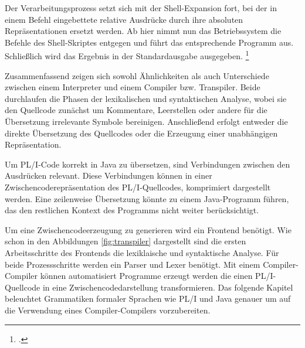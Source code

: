 Der Verarbeitungsprozess setzt sich mit der Shell-Expansion fort, bei der in einem Befehl eingebettete relative Ausdrücke durch ihre absoluten Repräsentationen ersetzt werden.
Ab hier nimmt nun das Betriebssystem die Befehle des Shell-Skriptes entgegen und führt das entsprechende Programm aus.
Schließlich wird das Ergebnis in der Standardausgabe ausgegeben. \footcite[Vgl. ][]{gnubash}


Zusammenfassend zeigen sich sowohl Ähnlichkeiten als auch Unterschiede zwischen einem Interpreter und einem Compiler bzw. Transpiler. Beide durchlaufen die Phasen der lexikalischen und syntaktischen Analyse, wobei sie den Quellcode zunächst um Kommentare, Leerstellen oder andere für die Übersetzung irrelevante Symbole bereinigen. Anschließend erfolgt entweder die direkte Übersetzung des Quellcodes oder die Erzeugung einer unabhängigen Repräsentation.

Um PL/I-Code korrekt in Java zu übersetzen, sind Verbindungen zwischen den Ausdrücken relevant. Diese Verbindungen können in einer Zwischencoderepräsentation des PL/I-Quellcodes, komprimiert dargestellt werden. Eine zeilenweise Übersetzung könnte zu einem Java-Programm führen, das den restlichen Kontext des Programms nicht weiter berücksichtigt.

Um eine Zwischencodeerzeugung zu generieren wird ein Frontend benötigt. Wie schon in den Abbildungen \ref{fig:transpiler} dargestellt sind die ersten Arbeitsschritte des Frontends die lexiklaische und syntaktische Analyse. Für beide Prozessschritte werden ein Parser und Lexer benötigt. Mit einem Compiler-Compiler können automatisiert Programme erzeugt werden die einen PL/I-Quellcode in eine Zwischencodedarstellung transformieren.
Das folgende Kapitel beleuchtet Grammatiken formaler Sprachen wie PL/I und Java genauer um auf die Verwendung eines Compiler-Compilers vorzubereiten.




